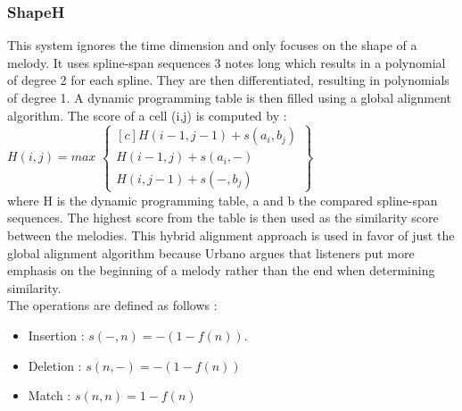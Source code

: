 \documentclass{llncs}
\begin{document}
        \subsubsection{ShapeH} 
        This system ignores the time dimension and only focuses on the shape of a melody. It uses spline-span sequences 3 notes long which results in a polynomial of degree 2 for each spline. They are then differentiated, resulting in polynomials of degree 1. 
        A dynamic programming table is then filled using a global alignment algorithm. The score of a cell (i,j) is computed by : \\
        $H(i,j) = max $
       $\begin{Bmatrix*}[c]
        H(i-1, j-1) + s(a_i, b_j) \\
        H(i-1,j) + s(a_i, -) \\
        H(i, j-1) + s(-,b_j)
        \end{Bmatrix*}$
		\\
		where H is the dynamic programming table, a and b the compared spline-span sequences. The highest score from the table is then used as the similarity score between the melodies. This hybrid alignment approach is used in favor of just the global alignment algorithm because Urbano argues that listeners put more emphasis on the beginning of a melody rather than the end when determining similarity. \\
		The operations are defined as follows : 
        \begin{itemize}
         \item Insertion : 
        $ s(-,n) = -(1-f(n)).$
        \item Deletion : 
         $s(n,-) = -(1 - f(n))$
        \item Match : 
        $s(n,n) = 1-f(n)$
        \end{itemize}
        
\end{document}
